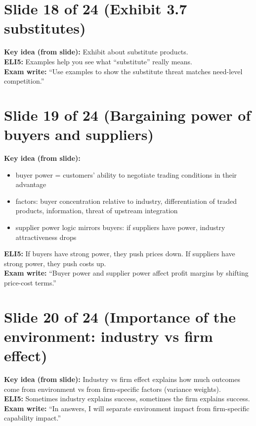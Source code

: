 \documentclass[11pt,a4paper]{article}
\begin{document}
\section*{Slide 18 of 24 (Exhibit 3.7 substitutes)}
\textbf{Key idea (from slide):} Exhibit about substitute products.\\
\textbf{ELI5:} Examples help you see what ``substitute'' really means.\\
\textbf{Exam write:} ``Use examples to show the substitute threat matches need-level competition.''

\section*{Slide 19 of 24 (Bargaining power of buyers and suppliers)}
\textbf{Key idea (from slide):}
\begin{itemize}
  \item buyer power = customers' ability to negotiate trading conditions in their advantage
  \item factors: buyer concentration relative to industry, differentiation of traded products, information, threat of upstream integration
  \item supplier power logic mirrors buyers: if suppliers have power, industry attractiveness drops
\end{itemize}
\textbf{ELI5:} If buyers have strong power, they push prices down. If suppliers have strong power, they push costs up.\\
\textbf{Exam write:} ``Buyer power and supplier power affect profit margins by shifting price-cost terms.''

\section*{Slide 20 of 24 (Importance of the environment: industry vs firm effect)}
\textbf{Key idea (from slide):} Industry vs firm effect explains how much outcomes come from environment vs from firm-specific factors (variance weights).\\
\textbf{ELI5:} Sometimes industry explains success, sometimes the firm explains success.\\
\textbf{Exam write:} ``In answers, I will separate environment impact from firm-specific capability impact.''

\end{document}
